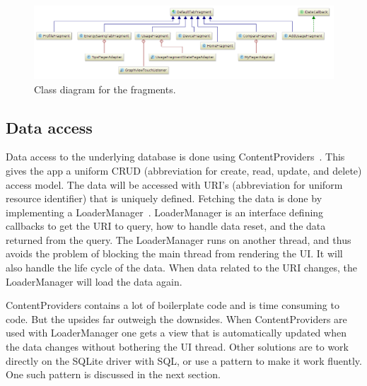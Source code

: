 \begin{figure}[H]
\includegraphics[width=\textwidth]{ch/architecture/fig/class_diagram_fragments.png}
\caption{Class diagram for the fragments.}
\label{fig:class_diagram_fragments}
\end{figure}

\subsection{Data access}
Data access to the underlying database is done using ContentProviders~\cite{contentproviders}. This gives the app a uniform \gls{CRUD} (abbreviation for create, read, update, and delete) access model. The data will be accessed with \gls{URI}'s (abbreviation for uniform resource identifier) that is uniquely defined. Fetching the data is done by implementing a LoaderManager~\cite{loadermanager}. LoaderManager is an interface defining callbacks to get the URI to query, how to handle data reset, and the data returned from the query. The LoaderManager runs on another thread, and thus avoids the problem of blocking the main thread from rendering the UI. It will also handle the life cycle of the data. When data related to the URI changes, the LoaderManager will load the data again. 

ContentProviders contains a lot of boilerplate code and is time consuming to code. But the upsides far outweigh the downsides. When ContentProviders are used with LoaderManager one gets a view that is automatically updated when the data changes without bothering the UI thread. Other solutions are to work directly on the SQLite driver with SQL, or use a pattern to make it work fluently. One such pattern is discussed in the next section. 

